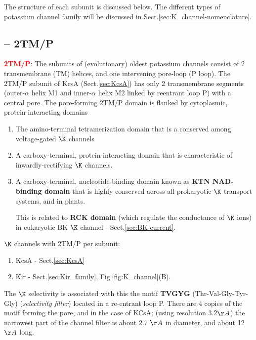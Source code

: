 The structure of each subunit is discussed below. The different types of
potassium channel family will be discussed in
Sect.\ref{sec:K_channel-nomenclature}.

\subsection{-- 2TM/P}
\label{sec:2TM/P}

\textcolor{red}{\bf 2TM/P}: The subunits of (evolutionary) oldest potassium
channels consist of  2 transmembrane (TM) helices, and one intervening pore-loop
(P loop).  The 2TM/P subunit of KcsA (Sect.\ref{sec:KcsA}) has only 2
transmembrane segments (outer-$\alpha$ helix M1 and inner-$\alpha$ helix M2
linked by reentrant loop P) with a central pore.  The pore-forming 2TM/P domain
is flanked by cytoplasmic, protein-interacting domains
\begin{enumerate}
  \item  The amino-terminal tetramerization domain that is a conserved among
  voltage-gated $\K$ channels
  
  \item A carboxy-terminal, protein-interacting domain that is characteristic of
  inwardly-rectifying $\K$ channels.
  
  \item A carboxy-terminal, nucleotide-binding domain known as {\bf KTN
  NAD-binding domain} that is highly conserved across all prokaryotic
  $\K$-transport systems, and in plants.
  
  This is related to {\bf RCK domain} (which regulate the conductance of $\K$
  ions) in eukaryotic BK $\K$ channel - Sect.\ref{sec:BK-current}.
\end{enumerate}

$\K$ channels with 2TM/P per subunit:
\begin{enumerate}
  \item KcsA - Sect.\ref{sec:KcsA}

 
  \item Kir - Sect.\ref{sec:Kir_family}, Fig.\ref{fig:K_channel}(B).
  
\end{enumerate}

The $\K$ selectivity is associated with this the motif {\bf TVGYG}
(Thr-Val-Gly-Tyr-Gly) ({\it selectivity filter}) located in a re-entrant loop
P. There are 4 copies of the motif forming the pore, and in the case of KCsA;
(using resolution 3.2$\AA$) the narrowest part of the channel filter is
about 2.7 $\AA$ in diameter, and about 12$\AA$ long.

